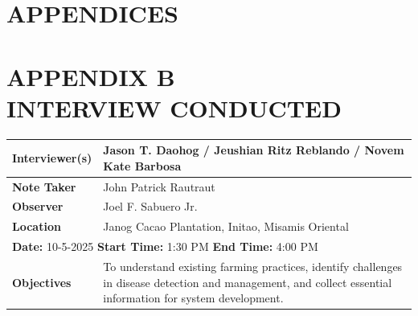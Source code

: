 \chapter*{APPENDICES}
{\baselineskip

	

	

	\chapter*{APPENDIX B \\ \normalfont INTERVIEW CONDUCTED}

	\begin{longtable}{|p{4cm}|p{10cm}|}
		\hline
		\textbf{Interviewer(s)} & Jason T. Daohog / Jeushian Ritz Reblando / Novem Kate Barbosa                                                                                                \\ \hline
		\textbf{Note Taker}     & John Patrick Rautraut                                                                                                                                        \\ \hline
		\textbf{Observer}       & Joel F. Sabuero Jr.                                                                                                                                          \\ \hline
		\textbf{Location}       & Janog Cacao Plantation, Initao, Misamis Oriental                                                                                                             \\ \hline
		\multicolumn{2}{|l|}{\textbf{Date:} 10-5-2025 \hspace{1cm} \textbf{Start Time:} 1:30 PM \hspace{1cm} \textbf{End Time:} 4:00 PM}                                                       \\ \hline
		\textbf{Objectives}     & To understand existing farming practices, identify challenges in disease detection and management, and collect essential information for system development. \\ \hline


\end{longtable}}
